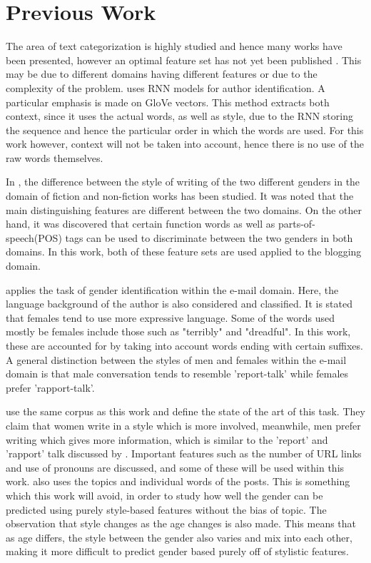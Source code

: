 \section{Previous Work}
The area of text categorization is highly studied and hence many works have been presented, however an optimal feature set has not yet been published \cite{1}. This may be due to different domains having different features or due to the complexity of the problem. \cite{1} uses RNN models for author identification. A particular emphasis is made on GloVe vectors. This method extracts both context, since it uses the actual words, as well as style, due to the RNN storing the sequence and hence the particular order in which the words are used. For this work however, context will not be taken into account, hence there is no use of the raw words themselves.

In \cite{3}, the difference between the style of writing of the two different genders in the domain of fiction and non-fiction works has been studied. It was noted that the main distinguishing features are different between the two domains. On the other hand, it was discovered that certain function words as well as parts-of-speech(POS) tags can be used to discriminate between the two genders in both domains. In this work, both of these feature sets are used applied to the blogging domain.

\cite{4} applies the task of gender identification within the e-mail domain. Here, the language background of the author is also considered and classified. It is stated that females tend to use more expressive language. Some of the words used mostly be females include those such as "terribly" and "dreadful". In this work, these are accounted for by taking into account words ending with certain suffixes. A general distinction between the styles of men and females within the e-mail domain is that male conversation tends to resemble 'report-talk' while females prefer 'rapport-talk'.

\cite{2} use the same corpus as this work and define the state of the art of this task. They claim that women write in a style which is more involved, meanwhile, men prefer writing which gives more information, which is similar to the 'report' and 'rapport' talk discussed by \cite{4}. Important features such as the number of URL links and use of pronouns are discussed, and some of these will be used within this work. \cite{2} also uses the topics and individual words of the posts. This is something which this work will avoid, in order to study how well the gender can be predicted using purely style-based features without the bias of topic. The observation that style changes as the age changes is also made. This means that as age differs, the style between the gender also varies and mix into each other, making it more difficult to predict gender based purely off of stylistic features.